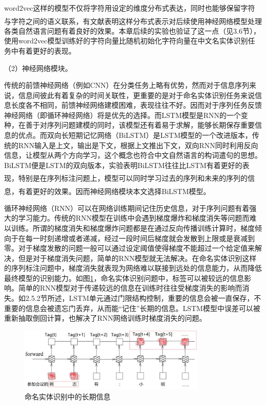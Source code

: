 \documentclass[winfonts,master,oneside,nobackinfo]{njuthesis}
\newcommand{\upcite}[1]{\textsuperscript{\textsuperscript{\cite{#1}}}}
\begin{document}
word2vec这样的模型不仅将字符用设定的维度分布式表达，同时也能够保留字符与字符之间的语义联系，有文献\upcite{Yoon}表明这样分布式表示对后续使用神经网络模型处理各类自然语言问题有着良好的效果。本章后续的实验也验证了这一点（见3.6节），使用word2vec模型训练好的字符向量比随机初始化字符向量在中文名实体识别任务中有着更好的表现。

（2）神经网络模块。

传统的前馈神经网络（例如CNN）在分类任务上略有优势，然而对于信息序列来说，信息间彼此有着复杂的时间关联性，更重要的是对于命名实体识别任务来说信息长度各不相同，前馈神经网络建模困难，表现往往不好。因而对于序列任务反馈神经网络（即循环神经网络）将是优先的选择。而LSTM模型是RNN的一个变种，在善于对序列问题建模的同时，该模型还有着易于求解，能够长期保存重要信息的优点。而双向长短期记忆网络（BiLSTM）是LSTM模型的一个改进版本，传统的RNN输入是上文，输出是下文，根据上文推出下文，双向RNN同时利用反向信息，让模型从两个方向学习，这个概念也符合中文自然语言的构词遣句的思想。BiLSTM便是LSTM的双向版本，实验表明BiLSTM往往比LSTM有着更好的表现\upcite{Graves}，特别是在序列标注问题上，模型可以同时学习过去的序列和未来的序列的信息，有着更好的效果\upcite{Huang}。因而神经网络模块本文选择BiLSTM模型。

循环神经网络（RNN）可以在网络训练期间记住历史信息，对于序列问题有着强大的学习能力。传统的RNN模型在训练中会遇到梯度爆炸和梯度消失等问题而难以训练。所谓的梯度消失和梯度爆炸问题都是在通过反向传播训练计算时，梯度倾向于在每一时刻递增或者递减，经过一段时间后梯度就会发散到上限或是衰减到零。对于梯度发散的问题一般可以通过设定阈值使得梯度不能超过一个给定值来解决，但是对于梯度消失问题，简单的RNN模型就无法解决。在命名实体识别这样的序列标注问题中，梯度消失就表现为网络难以联接到远处的信息能力，从而降低最终模型的识别能力。如图\ref{simple_rnn}，命名实体识别问题中，标签可以被较远的信息影响。简单的RNN模型对于传递较远的信息在训练时往往受梯度消失的影响而消失。如2.5.2节所述，LSTM单元通过门限结构控制，重要的信息会被一直保存，不重要的信息会被遗忘门丢弃，从而能“记住”长期的信息。LSTM模型中误差可以被重新抽取倒回计算，也解决了RNN网络训练时梯度消失的问题。

\begin{figure}[h]
\centering
\includegraphics[width=0.8\textwidth]{./figure/命名实体识别长期信息.jpg}
\caption{命名实体识别中的长期信息}
\label{simple_rnn}
\end{figure}
\end{document}
